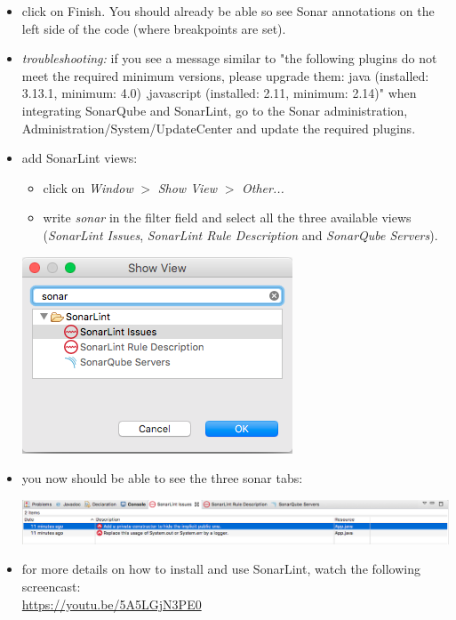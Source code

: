\documentclass{article}
\begin{document}
\begin{itemize}
\item click on Finish. You should already be able so see Sonar annotations on the left side of the code (where breakpoints are set).
\item {\em troubleshooting: } if you see a message similar to "the following plugins do not meet the required minimum versions, please upgrade them: java (installed: 3.13.1, minimum: 4.0) ,javascript (installed: 2.11, minimum: 2.14)" when integrating SonarQube and SonarLint, go to the Sonar administration, Administration/System/UpdateCenter and update the required plugins.
\item add SonarLint views:
\begin{itemize}
	\item click on \textit{Window} $ > $ \textit{Show View} $ > $ \textit{Other...} 
	\item write \textit{sonar} in the filter field and select all the three available views (\textit{SonarLint Issues}, \textit{SonarLint Rule Description} and \textit{SonarQube Servers}).
\end{itemize}
\begin{center}
	\includegraphics[scale=0.5]{figures/ss9.png}
\end{center}
\item you now should be able to see the three sonar tabs:
\begin{center}
\includegraphics[width=0.9\linewidth]{figures/ss10.png}
\end{center}
\item for more details on how to install and use SonarLint, watch the following screencast: \\
  \url{https://youtu.be/5A5LGjN3PE0}
\end{itemize}
\end{document}

